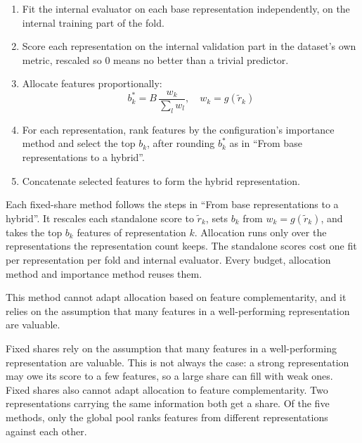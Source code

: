\begin{enumerate}
    \item Fit the internal evaluator on each base representation independently, on the internal training part of the fold.
    \item Score each representation on the internal validation part in the dataset's own metric, rescaled so 0 means no better than a trivial predictor.
    \item Allocate features proportionally:
    \[
    b^*_k = B \, \frac{w_k}{\sum_{l} w_l}, \quad w_k = g(\tilde r_k) %
    \]
    \item For each representation, rank features by the configuration's importance method and select the top $b_k$, after rounding $b^*_k$ as in ``From base representations to a hybrid''.
    \item Concatenate selected features to form the hybrid representation.
\end{enumerate}

Each fixed-share method follows the steps in ``From base representations to a hybrid''. It rescales each standalone score to $\tilde r_k$, sets $b_k$ from $w_k = g(\tilde r_k)$, and takes the top $b_k$ features of representation $k$. Allocation runs only over the representations the representation count keeps. The standalone scores cost one fit per representation per fold and internal evaluator. Every budget, allocation method and importance method reuses them.

This method cannot adapt allocation based on feature complementarity, and it relies on the assumption that many features in a well-performing representation are valuable.

Fixed shares rely on the assumption that many features in a well-performing representation are valuable. This is not always the case: a strong representation may owe its score to a few features, so a large share can fill with weak ones. Fixed shares also cannot adapt allocation to feature complementarity. Two representations carrying the same information both get a share. Of the five methods, only the global pool ranks features from different representations against each other.


